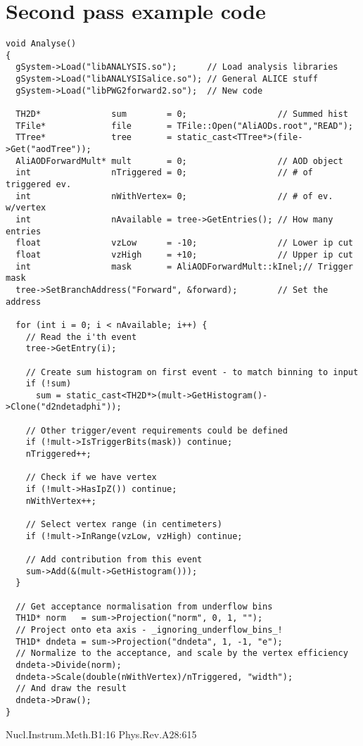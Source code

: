 \documentclass[11pt]{article}
\newcommand{\dndeta}[1][]{{\ensuremath%
    \ifx|#1|\else\left.\fi%
    \frac{1}{N}\frac{dN_{ch}}{d\eta}%
    \ifx|#1|\else\right|_{#1}\fi%
}}
\begin{document}
\section{Second pass example code}
\begin{lstlisting}[caption={Example 2\textsuperscript{nd} pass code to
    do $\dndeta$},label={lst:example},frame=single,captionpos=b]
void Analyse()
{ 
  gSystem->Load("libANALYSIS.so");      // Load analysis libraries
  gSystem->Load("libANALYSISalice.so"); // General ALICE stuff
  gSystem->Load("libPWG2forward2.so");  // New code 

  TH2D*              sum        = 0;                  // Summed hist
  TFile*             file       = TFile::Open("AliAODs.root","READ");
  TTree*             tree       = static_cast<TTree*>(file->Get("aodTree"));
  AliAODForwardMult* mult       = 0;                  // AOD object
  int                nTriggered = 0;                  // # of triggered ev.
  int                nWithVertex= 0;                  // # of ev. w/vertex
  int                nAvailable = tree->GetEntries(); // How many entries
  float              vzLow      = -10;                // Lower ip cut
  float              vzHigh     = +10;                // Upper ip cut
  int                mask       = AliAODForwardMult::kInel;// Trigger mask
  tree->SetBranchAddress("Forward", &forward);        // Set the address

  for (int i = 0; i < nAvailable; i++) { 
    // Read the i'th event 
    tree->GetEntry(i);

    // Create sum histogram on first event - to match binning to input
    if (!sum) 
      sum = static_cast<TH2D*>(mult->GetHistogram()->Clone("d2ndetadphi"));
    
    // Other trigger/event requirements could be defined 
    if (!mult->IsTriggerBits(mask)) continue; 
    nTriggered++;

    // Check if we have vertex 
    if (!mult->HasIpZ()) continue;
    nWithVertex++;

    // Select vertex range (in centimeters) 
    if (!mult->InRange(vzLow, vzHigh) continue; 

    // Add contribution from this event
    sum->Add(&(mult->GetHistogram()));
  }

  // Get acceptance normalisation from underflow bins 
  TH1D* norm   = sum->Projection("norm", 0, 1, "");
  // Project onto eta axis - _ignoring_underflow_bins_!
  TH1D* dndeta = sum->Projection("dndeta", 1, -1, "e");
  // Normalize to the acceptance, and scale by the vertex efficiency 
  dndeta->Divide(norm);
  dndeta->Scale(double(nWithVertex)/nTriggered, "width");
  // And draw the result
  dndeta->Draw();
}
\end{lstlisting}

\begin{thebibliography}{99}
 Nucl.Instrum.Meth.B1:16
 Phys.Rev.A28:615
\end{thebibliography}
\end{document}
